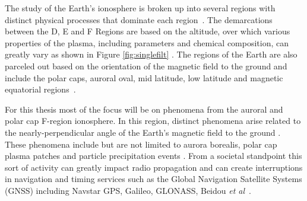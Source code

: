 %
% 
%

The study of the Earth's ionosphere is broken up into several regions with distinct physical processes that dominate each region~\cite{kellybook}. The demarcations between the D, E and F Regions are based on the altitude, over which various properties of the plasma, including parameters and chemical composition, can greatly vary as shown in Figure \ref{fig:singlefilt} \cite{kellybook}. The regions of the Earth are also parceled out based on the orientation of the magnetic field to the ground and include the polar caps, auroral oval, mid latitude, low latitude and magnetic equatorial regions~\cite{schunk2004ionospheres}.

For this thesis most of the focus will be on phenomena from the auroral and polar cap F-region ionosphere. In this region, distinct phenomena arise related to the nearly-perpendicular angle of the Earth's magnetic field to the ground \cite{schunk2004ionospheres}. These phenomena include but are not limited to aurora borealis, polar cap plasma patches and particle precipitation events \cite{Perry:2015jf,Dahlgren:2013ip,dahlgren2012di,Dahlgren:2012dq,semeter:plasmatransport2012}. From a societal standpoint this sort of activity can greatly impact radio propagation and can create interruptions in navigation and timing services such as the Global Navigation Satellite Systems (GNSS) including Navstar GPS, Galileo, GLONASS, Beidou \textit{et al}~\cite{Jiao:2013ei,hunsucker2007high}.


